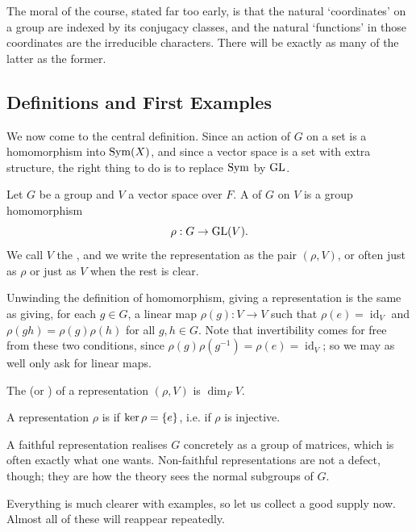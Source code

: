 \documentclass[a4paper]{scrartcl}
\newcommand{\id}{\operatorname{id}}
\begin{document}
The moral of the course, stated far too early, is that the natural `coordinates' on a group are indexed by its conjugacy classes, and the natural `functions' in those coordinates are the irreducible characters. There will be exactly as many of the latter as the former.

\subsection{Definitions and First Examples}

We now come to the central definition. Since an action of $G$ on a set is a homomorphism into $\operatorname{Sym}(X)$, and since a vector space is a set with extra structure, the right thing to do is to replace $\operatorname{Sym}$ by $\operatorname{GL}$.

\begin{definition}[Representation]
	Let $G$ be a group and $V$ a vector space over $F$. A  of $G$ on $V$ is a group homomorphism
	$$\rho : G \to \operatorname{GL}(V).$$
	We call $V$ the , and we write the representation as the pair $(\rho, V)$, or often just as $\rho$ or just as $V$ when the rest is clear.
\end{definition}

Unwinding the definition of homomorphism, giving a representation is the same as giving, for each $g \in G$, a linear map $\rho(g) : V \to V$ such that $\rho(e) = \id_V$ and $\rho(gh) = \rho(g)\rho(h)$ for all $g,h \in G$. Note that invertibility comes for free from these two conditions, since $\rho(g)\rho(g^{-1}) = \rho(e) = \id_V$; so we may as well only ask for linear maps.

\begin{definition}[Degree]
	The  (or ) of a representation $(\rho, V)$ is $\dim_F V$.
\end{definition}

\begin{definition}
	A representation $\rho$ is  if $\operatorname{ker} \rho = \{e\}$, i.e. if $\rho$ is injective.
\end{definition}

A faithful representation realises $G$ concretely as a group of matrices, which is often exactly what one wants. Non-faithful representations are not a defect, though; they are how the theory sees the normal subgroups of $G$.

Everything is much clearer with examples, so let us collect a good supply now. Almost all of these will reappear repeatedly.
\end{document}
